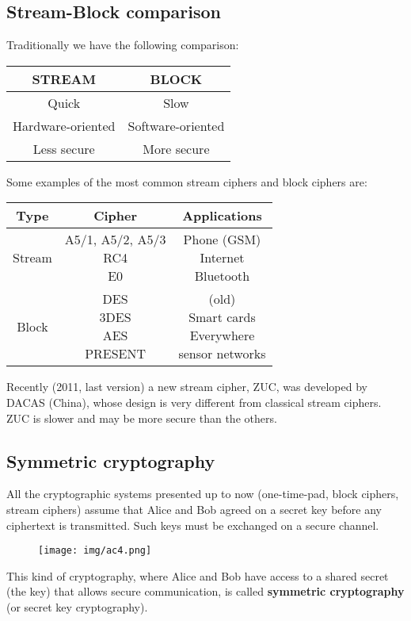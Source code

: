 \documentclass[a4paper, 10pt, titlepage]{article}
\begin{document}
\subsection{Stream-Block comparison}
Traditionally we have the following comparison:
\begin{center}
\begin{tabular}{c | c}
STREAM & BLOCK \\ \hline
Quick & Slow \\
Hardware-oriented & Software-oriented \\
Less secure & More secure
\end{tabular}
\end{center}
Some examples of the most common stream ciphers and block ciphers are:
\begin{center}
\begin{tabular}{c | c | c}
Type & Cipher & Applications \\ \hline
Stream & \thead{A5/1, A5/2, A5/3 \\ RC4 \\ E0} & \thead{Phone (GSM) \\ Internet \\ Bluetooth}\\ \hline
Block & \thead{DES \\ 3DES \\ AES \\ PRESENT} & \thead{(old)\\Smart cards \\ Everywhere \\ sensor networks}
\end{tabular}
\end{center}
Recently (2011, last version) a new stream cipher, ZUC, was developed by DACAS (China), whose design is very different from classical stream ciphers. ZUC is slower and may be more secure than the others.

\subsection{Symmetric cryptography}
All the cryptographic systems presented up to now (one-time-pad, block ciphers, stream ciphers) assume that Alice and Bob agreed on a secret key before any ciphertext is transmitted. Such keys must be exchanged on a secure channel.
\begin{figure}[h]
\centering
\texttt{[image: img/ac4.png]}
\end{figure}
This kind of cryptography, where Alice and Bob have access to a shared secret (the key) that allows secure communication, is called \textbf{symmetric cryptography} (or secret key cryptography).
\end{document}
